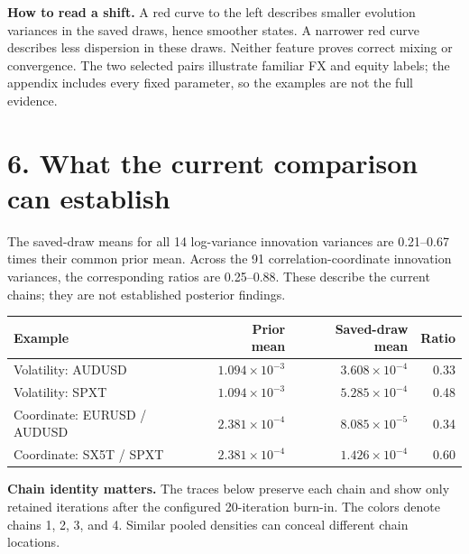 \documentclass[10pt,a4paper]{article}
\begin{document}
\par\medskip
\textbf{How to read a shift.} A red curve to the left describes smaller evolution
variances in the saved draws, hence smoother states. A narrower red curve describes less
dispersion in these draws. Neither feature proves correct mixing or convergence.
The two selected pairs illustrate familiar FX and equity labels; the appendix includes
every fixed parameter, so the examples are not the full evidence.

\clearpage
\section*{6. What the current comparison can establish}
The saved-draw means for all 14 log-variance innovation variances are
0.21--0.67 times their common prior mean. Across the 91 correlation-coordinate
innovation variances, the corresponding ratios are 0.25--0.88.
These describe the current chains; they are not established posterior findings.
\begin{center}\small
\begin{tabular}{lrrr}\toprule
Example & Prior mean & Saved-draw mean & Ratio\\\midrule
Volatility: AUDUSD & $1.094\times10^{-3}$ & $3.608\times10^{-4}$ & 0.33 \\
Volatility: SPXT & $1.094\times10^{-3}$ & $5.285\times10^{-4}$ & 0.48 \\
Coordinate: EURUSD / AUDUSD & $2.381\times10^{-4}$ & $8.085\times10^{-5}$ & 0.34 \\
Coordinate: SX5T / SPXT & $2.381\times10^{-4}$ & $1.426\times10^{-4}$ & 0.60 \\
\bottomrule\end{tabular}\end{center}
\textbf{Chain identity matters.} The traces below preserve each chain and show only retained
iterations after the configured 20-iteration burn-in. The colors denote chains
\textcolor{chainone}{1}, \textcolor{chaintwo}{2}, \textcolor{chainthree}{3}, and
\textcolor{chainfour}{4}. Similar pooled densities can conceal different chain locations.
\par\smallskip
\end{document}

